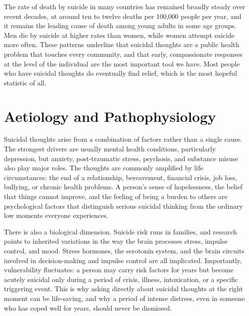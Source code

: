 The rate of death by suicide in many countries has remained broadly steady over recent decades, at around ten to twelve deaths per 100,000 people per year, and it remains the leading cause of death among young adults in some age groups. Men die by suicide at higher rates than women, while women attempt suicide more often. These patterns underline that suicidal thoughts are a public health problem that touches every community, and that early, compassionate responses at the level of the individual are the most important tool we have. Most people who have suicidal thoughts do eventually find relief, which is the most hopeful statistic of all.

\section*{Aetiology and Pathophysiology}
Suicidal thoughts arise from a combination of factors rather than a single cause. The strongest drivers are usually mental health conditions, particularly depression, but anxiety, post-traumatic stress, psychosis, and substance misuse also play major roles. The thoughts are commonly amplified by life circumstances: the end of a relationship, bereavement, financial crisis, job loss, bullying, or chronic health problems. A person's sense of hopelessness, the belief that things cannot improve, and the feeling of being a burden to others are psychological factors that distinguish serious suicidal thinking from the ordinary low moments everyone experiences.

There is also a biological dimension. Suicide risk runs in families, and research points to inherited variations in the way the brain processes stress, impulse control, and mood. Stress hormones, the serotonin system, and the brain circuits involved in decision-making and impulse control are all implicated. Importantly, vulnerability fluctuates: a person may carry risk factors for years but become acutely suicidal only during a period of crisis, illness, intoxication, or a specific triggering event. This is why asking directly about suicidal thoughts at the right moment can be life-saving, and why a period of intense distress, even in someone who has coped well for years, should never be dismissed.

